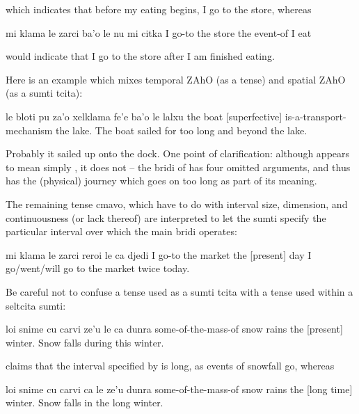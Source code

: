 {\noindent}which indicates that before my eating begins, I go to the
    store, whereas
\begin{example}
mi klama le zarci ba'o le nu mi citka\n
I go-to the store  the event-of I eat
\end{example}

{\noindent}would indicate that I go to the store after I am finished
    eating. 

Here is an example which mixes temporal ZAhO (as a tense)
    and spatial ZAhO (as a sumti tcita):
\begin{example}
le bloti pu za'o xelklama\n
\T	fe'e ba'o le lalxu\n
the boat  [superfective]\n
\T	is-a-transport-mechanism\n
\T	[space] [perfective] the lake.\n
The boat sailed for too long and beyond the lake.
\end{example}

Probably it sailed up onto the dock. One point of
    clarification: although  appears to mean simply
    , it does not -- the bridi of  has four omitted arguments,
    and thus has the (physical) journey which goes on too long as
    part of its meaning.

The remaining tense cmavo, which have to do with interval
    size, dimension, and continuousness (or lack thereof) are
    interpreted to let the sumti specify the particular interval
    over which the main bridi operates:
\begin{example}
mi klama le zarci reroi le ca djedi\n
I go-to the market  the [present] day\n
I go/went/will go to the market twice today.
\end{example}

Be careful not to confuse a tense used as a sumti tcita with a
    tense used within a seltcita sumti:
\begin{example}
loi snime cu carvi\n
\T	ze'u le ca dunra\n
some-of-the-mass-of snow rains\n
\T	{} the [present] winter.\n
Snow falls during this winter.
\end{example}

{\noindent}claims that the interval specified by  is long,
    as events of snowfall go, whereas
\begin{example}
loi snime cu carvi\n
\T	ca le ze'u dunra\n
some-of-the-mass-of snow rains\n
\T	{} the [long time] winter.\n
Snow falls in the long winter.
\end{example}

